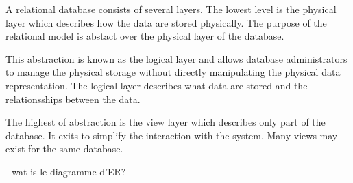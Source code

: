A relational database consists of several layers.
The lowest level is the physical layer which describes how the data are stored physically.
The purpose of the relational model is abstact over the physical layer of the database.

This abstraction is known as the logical layer and allows database administrators to manage the physical storage without directly manipulating the physical data representation.
The logical layer describes what data are stored and the relationsships between the data.

The highest of abstraction is the view layer which describes only part of the database. It exits to simplify the interaction with the system. Many views may exist for the same database.

- wat is le diagramme d'ER?
